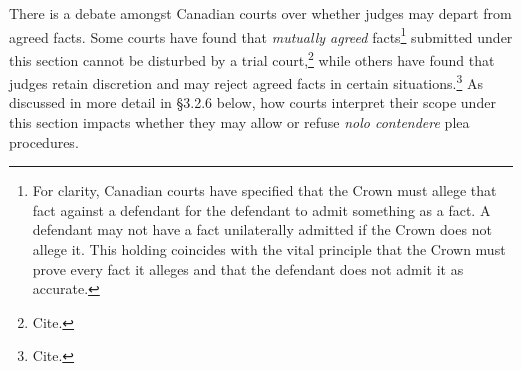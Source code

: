 There is a debate amongst Canadian courts over whether judges may depart from agreed facts. Some courts have found that \textit{mutually agreed} facts\footnote{For clarity, Canadian courts have specified that the Crown must allege that fact against a defendant for the defendant to admit something as a fact. A defendant may not have a fact unilaterally admitted if the Crown does not allege it. This holding coincides with the vital principle that the Crown must prove every fact it alleges and that the defendant does not admit it as accurate.} submitted under this section cannot be disturbed by a trial court,\footnote{Cite.} while others have found that judges retain discretion and may reject agreed facts in certain situations.\footnote{Cite.} As discussed in more detail in \S 3.2.6 below, how courts interpret their scope under this section impacts whether they may allow or refuse \textit{nolo contendere} plea procedures.